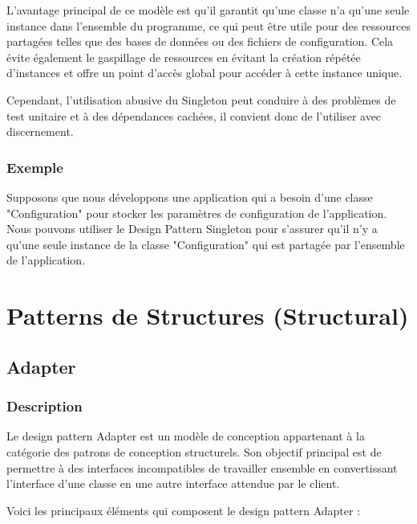 \documentclass[french]{article}
\begin{document}
L'avantage principal de ce modèle est qu'il garantit qu'une classe n'a qu'une seule instance dans l'ensemble du programme, ce qui peut être utile pour des ressources partagées telles que des bases de données ou des fichiers de configuration. Cela évite également le gaspillage de ressources en évitant la création répétée d'instances et offre un point d'accès global pour accéder à cette instance unique.

Cependant, l'utilisation abusive du Singleton peut conduire à des problèmes de test unitaire et à des dépendances cachées, il convient donc de l'utiliser avec discernement.


\subsubsection{Exemple}

Supposons que nous développons une application qui a besoin d'une classe "Configuration" pour stocker les paramètres de configuration de l'application. Nous pouvons utiliser le Design Pattern Singleton pour s'assurer qu'il n'y a qu'une seule instance de la classe "Configuration" qui est partagée par l'ensemble de l'application.







\section{Patterns de Structures (Structural)}

\subsection{Adapter}


\subsubsection{Description}

Le design pattern Adapter est un modèle de conception appartenant à la catégorie des patrons de conception structurels. Son objectif principal est de permettre à des interfaces incompatibles de travailler ensemble en convertissant l'interface d'une classe en une autre interface attendue par le client.

Voici les principaux éléments qui composent le design pattern Adapter :
\end{document}
